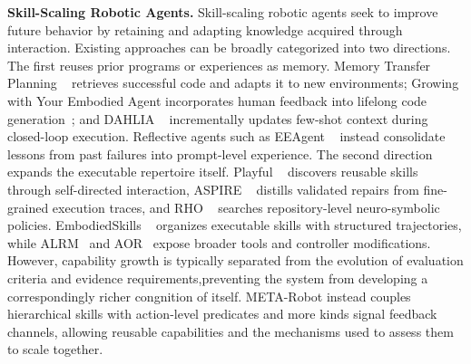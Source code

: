 \documentclass{article} %
\begin{document}
\textbf{Skill-Scaling Robotic Agents.}
Skill-scaling robotic agents seek to improve future behavior by retaining and adapting knowledge acquired through interaction. Existing approaches can be broadly categorized into two directions. The first reuses prior programs or experiences as memory. Memory Transfer Planning ~\cite{kagaya2025memorytransfer} retrieves successful code and adapts it to new environments; Growing with Your Embodied Agent incorporates human feedback into lifelong code generation~\cite{yang2025growing}; and DAHLIA ~\cite{ghiadini2025dahlia} incrementally updates few-shot context during closed-loop execution. Reflective agents such as EEAgent ~\cite{chen2026eeagent} instead consolidate lessons from past failures into prompt-level experience. The second direction expands the executable repertoire itself. Playful ~\cite{zhang2026playful} discovers reusable skills through self-directed interaction, ASPIRE ~\cite{lu2026aspire} distills validated repairs from fine-grained execution traces, and RHO ~\cite{elmaaroufi2026rho} searches repository-level neuro-symbolic policies. EmbodiedSkills ~\cite{wang2026embodiedskills} organizes executable skills with structured trajectories, while ALRM~\cite{yang2026alrm} and AOR~\cite{kumar2026aor} expose broader tools and controller modifications. However, capability growth is typically separated from the evolution of evaluation criteria and evidence requirements,preventing the system from developing a correspondingly richer congnition of itself. META-Robot instead couples hierarchical skills with action-level predicates and more kinds signal feedback channels, allowing reusable capabilities and the mechanisms used to assess them to scale together.
\end{document}
